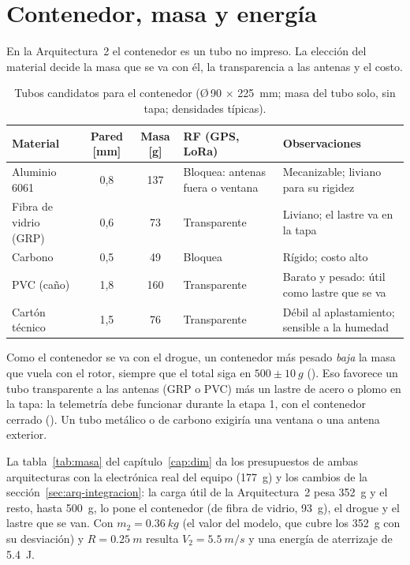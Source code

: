 \section{Contenedor, masa y energía}\label{sec:arq-masa}

En la Arquitectura~2 el contenedor es un tubo no impreso. La elección del material
decide la masa que se va con él, la transparencia a las antenas y el costo.

\begin{table}[H]
\centering\small
\caption{Tubos candidatos para el contenedor (Ø\,90 $\times$ \SI{225}{mm}; masa del tubo solo,
sin tapa; densidades típicas).}\label{tab:arq-tubos}
\begin{tabularx}{\textwidth}{@{}lccYY@{}}
\toprule
\textbf{Material} & \textbf{Pared} [mm] & \textbf{Masa} [g] & \textbf{RF (GPS, LoRa)} & \textbf{Observaciones}\\\midrule
Aluminio 6061 & 0,8 & 137 & Bloquea: antenas fuera o ventana & Mecanizable; liviano para su rigidez\\
Fibra de vidrio (GRP) & 0,6 & 73 & Transparente & Liviano; el lastre va en la tapa\\
Carbono & 0,5 & 49 & Bloquea & Rígido; costo alto\\
PVC (caño) & 1,8 & 160 & Transparente & Barato y pesado: útil como lastre que se va\\
Cartón técnico & 1,5 & 76 & Transparente & Débil al aplastamiento; sensible a la humedad\\
\bottomrule
\end{tabularx}
\end{table}

Como el contenedor se va con el drogue, un contenedor más pesado \emph{baja} la masa que
vuela con el rotor, siempre que el total siga en $500\pm\SI{10}{g}$ (). Eso
favorece un tubo transparente a las antenas (GRP o PVC) más un lastre de acero o plomo en la
tapa: la telemetría debe funcionar durante la etapa 1, con el contenedor cerrado
(). Un tubo metálico o de carbono exigiría una ventana o una antena exterior.

La tabla~\ref{tab:masa} del capítulo~\ref{cap:dim} da los presupuestos de ambas
arquitecturas con la electrónica real del equipo (\SI{177}{g}) y los cambios de la
sección~\ref{sec:arq-integracion}: la carga útil de la Arquitectura~2 pesa \SI{352}{g} y el
resto, hasta \SI{500}{g}, lo pone el contenedor (de fibra de vidrio, \SI{93}{g}), el
drogue y el lastre que se van. Con $m_2=\SI{0.36}{kg}$ (el valor del modelo, que cubre los
\SI{352}{g} con su desviación) y $R=\SI{0.25}{m}$ resulta
$V_2=\SI{5.5}{m/s}$ y una energía de aterrizaje de \SI{5.4}{J}.


